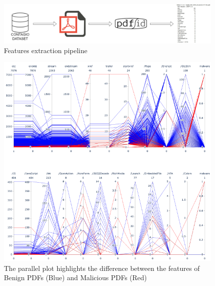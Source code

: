\documentclass[twocolumn, switch]{article} %
\newcommand\x{0.7}
\begin{document}
\begin{figure}[ht!]
	\centering
	\includegraphics[width=\x\linewidth]{data_extraction.png}
	\caption{Features extraction pipeline}
	\label{fig:data}
	\vspace{-2mm}
\end{figure}

\begin{figure}[ht!]
	\centering
	\includegraphics[width=\x\linewidth]{parallel_coords.png}
	\caption{The parallel plot highlights the difference between the features of Benign PDFs (Blue) and Malicious PDFs (Red)}
	\label{fig:parallel}
	\vspace{-5mm}
\end{figure}
\end{document}
